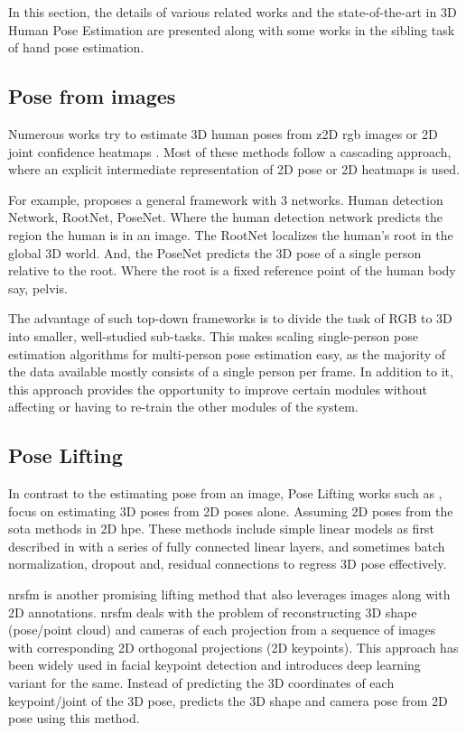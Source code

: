 In this section, the details of various related works and the state-of-the-art in 3D Human Pose Estimation are presented along with some works in the sibling task of hand pose estimation.

\subsection{Pose from images}
Numerous works try to estimate 3D human poses from z2D \ac{rgb} images or 2D joint confidence heatmaps \cite{CameraDistanceAware, poselifter, DistillNRSfM, occlusionVideo}. Most of these methods follow a cascading approach, where an explicit intermediate representation of 2D pose or 2D heatmaps is used.

For example, \cite{CameraDistanceAware} proposes a general framework with 3 networks. Human detection Network, RootNet, PoseNet. Where the human detection network predicts the region the human is in an image. The RootNet localizes the human's root in the global 3D world. And, the PoseNet predicts the 3D pose of a single person relative to the root. Where the root is a fixed reference point of the human body say, pelvis.

The advantage of such top-down frameworks is to divide the task of RGB to 3D into smaller, well-studied sub-tasks. This makes scaling single-person pose estimation algorithms for multi-person pose estimation easy, as the majority of the data available mostly consists of a single person per frame. In addition to it, this approach provides the opportunity to improve certain modules without affecting or having to re-train the other modules of the system.

\subsection{Pose Lifting}

In contrast to the estimating pose from an image, Pose Lifting works such as \cite{poselifter,  amazon1, repnet, c3dpo, unsupervisedAdversarial}, focus on estimating 3D poses from 2D poses alone. Assuming 2D poses from the \ac{sota} methods in 2D \ac{hpe}. These methods include simple linear models as first described in \cite{MartinezHRL17} with a series of fully connected linear layers, and sometimes batch normalization, dropout and, residual connections to regress 3D pose effectively.

\ac{nrsfm} is another promising lifting method that also leverages images along with 2D annotations. \ac{nrsfm} deals with the problem of reconstructing 3D shape (pose/point cloud) and cameras of each projection from a sequence of images with corresponding 2D orthogonal projections (2D keypoints). This approach has been widely used in facial keypoint detection and \cite{deepNRSFM} introduces deep learning variant for the same. Instead of predicting the 3D coordinates of each keypoint/joint of the 3D pose, \cite{DistillNRSfM, c3dpo, deepNRSFM, nrsfm++} predicts the 3D shape and camera pose from 2D pose using this method.

